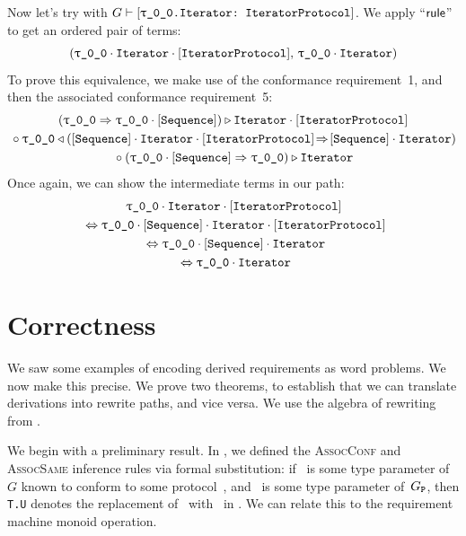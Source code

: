 \documentclass[../generics]{subfiles}
\begin{document}
\begin{example}
Now let's try with $G\vdash\ConfReq{\rT.Iterator}{IteratorProtocol}$. We apply ``$\mathsf{rule}$'' to get an ordered pair of terms:
\[
(\rT\cdot\nIterator\cdot\pIterator,\,\rT\cdot\nIterator)
\]
To prove this equivalence, we make use of the conformance requirement~1, and then the associated conformance requirement~5:
\begin{gather*}
(\rT\Red\rT\cdot\pSequence)\WR\nIterator\cdot\pIterator\\
{} \circ \rT\WL(\pSequence\cdot\nIterator\cdot\pIterator\!\Red\!\pSequence\cdot\nIterator)\\
{} \circ (\rT\cdot\pSequence\Red\rT)\WR\nIterator
\end{gather*}
Once again, we can show the intermediate terms in our path:
\begin{gather*}
\rT\cdot\nIterator\cdot\pIterator\\
{} \Eq \rT\cdot\pSequence\cdot\nIterator\cdot\pIterator\\
{} \Eq \rT\cdot\pSequence\cdot\nIterator\\
{} \Eq \rT\cdot\nIterator
\end{gather*}
\end{example}

\section{Correctness}\label{sec:rqm correctness}

We saw some examples of encoding derived requirements as word problems. We now make this precise. We prove two theorems, to establish that we can translate derivations into rewrite paths, and vice versa. We use the algebra of rewriting from .

We begin with a preliminary result. In , we defined the \textsc{AssocConf} and \textsc{AssocSame} inference rules via formal substitution: if \tT\ is some type parameter of~$G$ known to conform to some protocol~\tP, and \SelfU\ is some type parameter of~$G_{\texttt{P}}$, then \texttt{T.U} denotes the replacement of \tSelf\ with \tT\ in \SelfU. We can relate this to the requirement machine monoid operation.
\end{document}
